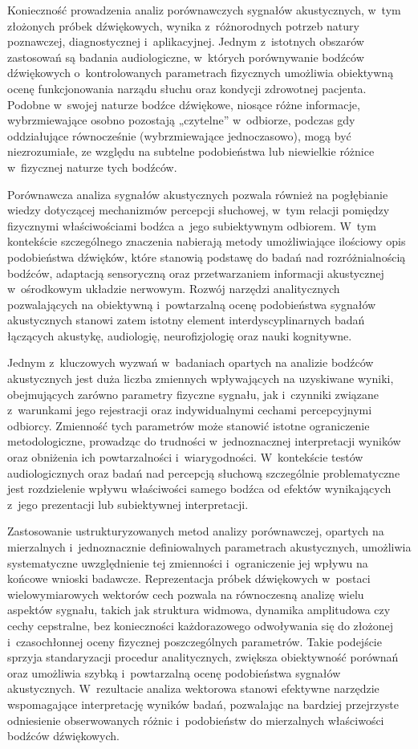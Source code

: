 \documentclass{article}
\begin{document}
Konieczność prowadzenia analiz porównawczych sygnałów akustycznych, w~tym złożonych próbek dźwiękowych, wynika z~różnorodnych potrzeb natury poznawczej, diagnostycznej i~aplikacyjnej. Jednym z~istotnych obszarów zastosowań są badania audiologiczne, w~których porównywanie bodźców dźwiękowych o~kontrolowanych parametrach fizycznych umożliwia obiektywną ocenę funkcjonowania narządu słuchu oraz kondycji zdrowotnej pacjenta. 
Podobne w~swojej naturze bodźce dźwiękowe, niosące różne informacje, wybrzmiewające osobno pozostają „czytelne” w odbiorze, podczas gdy oddziałujące równocześnie (wybrzmiewające jednoczasowo), mogą być niezrozumiałe, ze względu na subtelne podobieństwa lub niewielkie różnice w fizycznej naturze tych bodźców. 

Porównawcza analiza sygnałów akustycznych pozwala również na pogłębianie wiedzy dotyczącej mechanizmów percepcji słuchowej, w~tym relacji pomiędzy fizycznymi właściwościami bodźca a~jego subiektywnym odbiorem. W~tym kontekście szczególnego znaczenia nabierają metody umożliwiające ilościowy opis podobieństwa dźwięków, które stanowią podstawę do badań nad rozróżnialnością bodźców, adaptacją sensoryczną oraz przetwarzaniem informacji akustycznej w~ośrodkowym układzie nerwowym. 
Rozwój narzędzi analitycznych pozwalających na obiektywną i~powtarzalną ocenę podobieństwa sygnałów akustycznych stanowi zatem istotny element interdyscyplinarnych badań łączących akustykę, audiologię, neurofizjologię oraz nauki kognitywne. 

Jednym z~kluczowych wyzwań w~badaniach opartych na analizie bodźców akustycznych jest duża liczba zmiennych wpływających na uzyskiwane wyniki, obejmujących zarówno parametry fizyczne sygnału, jak i~czynniki związane z~warunkami jego rejestracji oraz indywidualnymi cechami percepcyjnymi odbiorcy\cite{Letowski1989SoundQuality}. Zmienność tych parametrów może stanowić istotne ograniczenie metodologiczne, prowadząc do trudności w~jednoznacznej interpretacji wyników oraz obniżenia ich powtarzalności i~wiarygodności. W~kontekście testów audiologicznych oraz badań nad percepcją słuchową szczególnie problematyczne jest rozdzielenie wpływu właściwości samego bodźca od efektów wynikających z~jego prezentacji lub subiektywnej interpretacji. 

Zastosowanie ustrukturyzowanych metod analizy porównawczej, opartych na mierzalnych i~jednoznacznie definiowalnych parametrach akustycznych, umożliwia systematyczne uwzględnienie tej zmienności i~ograniczenie jej wpływu na końcowe wnioski badawcze. Reprezentacja próbek dźwiękowych w~postaci wielowymiarowych wektorów cech pozwala na równoczesną analizę wielu aspektów sygnału, takich jak struktura widmowa, dynamika amplitudowa czy cechy cepstralne, bez konieczności każdorazowego odwoływania się do złożonej i~czasochłonnej oceny fizycznej poszczególnych parametrów. Takie podejście sprzyja standaryzacji procedur analitycznych, zwiększa obiektywność porównań oraz umożliwia szybką i~powtarzalną ocenę podobieństwa sygnałów akustycznych. W~rezultacie analiza wektorowa stanowi efektywne narzędzie wspomagające interpretację wyników badań, pozwalając na bardziej przejrzyste odniesienie obserwowanych różnic i~podobieństw do mierzalnych właściwości bodźców dźwiękowych.
\end{document}
